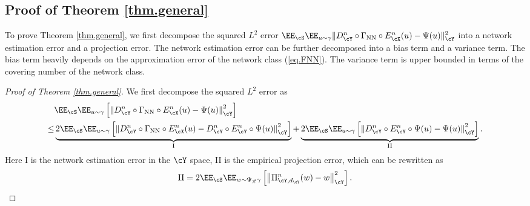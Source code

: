 \documentclass[11pt]{article} %
\begin{document}
\subsection{Proof of Theorem \ref{thm.general}}
\label{thm.general.proof}

To prove Theorem \ref{thm.general}, we first decompose the squared $L^2$ error $\EE_{\cS}\EE_{u\sim \gamma}\|D_{\cY}^n\circ \Gamma_{\rm NN} \circ E_{\cX}^n(u)- \Psi(u)\|_{\cY}^2$ into a network estimation error and a projection error. The network estimation error can be further decomposed into a bias term and a variance term. The bias term heavily depends on the approximation error of the network class (\ref{eq.FNN}). The variance term is upper bounded in terms of the covering number of the network class. 

\begin{proof}[Proof of Theorem \ref{thm.general}]
We first decompose the squared $L^2$ error as
\begin{align}
	&\EE_{\cS}\EE_{u\sim \gamma}\left[\left\|D_{\cY}^n\circ \Gamma_{\rm NN} \circ E_{\cX}^n(u)- \Psi(u)\right\|_{\cY}^2\right] \nonumber\\
	\leq&  \underbrace{2\EE_{\cS}\EE_{u\sim \gamma}\left[\left\|D_{\cY}^n\circ \Gamma_{\rm NN} \circ E_{\cX}^n(u)-D_{\cY}^n\circ E_{\cY}^n\circ \Psi(u)\right\|_{\cY}^2\right]}_{\rm I}+\underbrace{2\EE_{\cS}\EE_{u\sim \gamma}\left[\left\|D_{\cY}^n\circ E_{\cY}^n\circ \Psi(u)- \Psi(u)\right\|_{\cY}^2\right]}_{\rm II}.
	\label{eq.err.decom}
\end{align}
Here I is the network estimation error in the $\cY$ space, II is the empirical projection error, which can be rewritten as
\begin{align}
	{\rm II}=2\EE_{\cS}\EE_{w\sim \Psi_{\#}\gamma} \left[\left\|\Pi_{\cY,d_{\cY}}^n(w)- w\right\|_{\cY}^2\right].
	\label{eq.II}
\end{align}


\end{proof}
\end{document}
